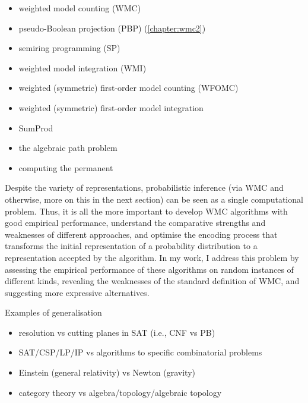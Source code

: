 \begin{itemize}
\item weighted model counting (WMC) \citep{DBLP:journals/ai/ChaviraD08}
\item pseudo-Boolean projection (PBP) (\cref{chapter:wmc2})
\item semiring programming (SP) \citep{DBLP:journals/ijar/BelleR20}
\item weighted model integration (WMI) \citep{DBLP:conf/ijcai/BellePB15}
\item weighted (symmetric) first-order model counting (WFOMC) \citep{DBLP:conf/ijcai/BroeckTMDR11}
\item weighted (symmetric) first-order model integration \citep{DBLP:conf/uai/FeldsteinB21}
\item SumProd \citep{DBLP:journals/ai/Dechter99,DBLP:journals/jair/BacchusDP09}
\item the algebraic path problem \citep{DBLP:series/synthesis/2010Baras}
\item computing the permanent \citep{DBLP:journals/tcs/Valiant79}
\end{itemize}

Despite the variety of representations, probabilistic inference (via WMC and
otherwise, more on this in the next section) can be seen as a single
computational problem. Thus, it is all the more important to develop WMC
algorithms with good empirical performance, understand the comparative strengths
and weaknesses of different approaches, and optimise the encoding process that
transforms the initial representation of a probability distribution to a
representation accepted by the algorithm. In my work, I address this problem by
assessing the empirical performance of these algorithms on random instances of
different kinds, revealing the weaknesses of the standard definition of WMC, and
suggesting more expressive alternatives.


Examples of generalisation
\begin{itemize}
\item resolution vs cutting planes in SAT (i.e., CNF vs PB)
\item SAT/CSP/LP/IP vs algorithms to specific combinatorial problems
\item Einstein (general relativity) vs Newton (gravity)
\item category theory vs algebra/topology/algebraic topology
\end{itemize}

